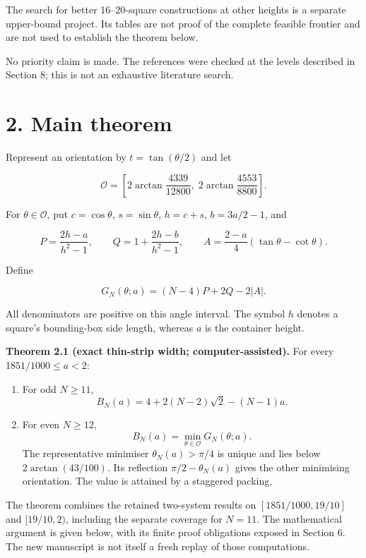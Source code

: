\documentclass[
  11pt,
  a4paper,
]{article}
\providecommand{\tightlist}{%
  \setlength{\itemsep}{0pt}\setlength{\parskip}{0pt}}
\begin{document}
The search for better 16--20-square constructions at other heights is a
separate upper-bound project. Its tables are not proof of the complete
feasible frontier and are not used to establish the theorem below.

No priority claim is made. The references were checked at the levels
described in Section 8; this is not an exhaustive literature search.

\section{2. Main theorem}\label{main-theorem}

Represent an orientation by \(t=\tan(\theta/2)\) and let

\[
\mathcal O=\left[2\arctan\frac{4339}{12800},\;2\arctan\frac{4553}{8800}\right].
\]

For \(\theta\in\mathcal O\), put \(c=\cos\theta\), \(s=\sin\theta\),
\(h=c+s\), \(b=3a/2-1\), and

\[
P=\frac{2h-a}{h^2-1},\qquad
Q=1+\frac{2h-b}{h^2-1},\qquad
A=\frac{2-a}{4}(\tan\theta-\cot\theta).
\]

Define

\[
G_N(\theta;a)=(N-4)P+2Q-2|A|.
\]

All denominators are positive on this angle interval. The symbol \(h\)
denotes a square's bounding-box side length, whereas \(a\) is the
container height.

\textbf{Theorem 2.1 (exact thin-strip width; computer-assisted).} For
every \(1851/1000\le a<2\):

\begin{enumerate}
\def\labelenumi{\arabic{enumi}.}
\tightlist
\item
  For odd \(N\ge11\), \[
  B_N(a)=4+2(N-2)\sqrt2-(N-1)a.
  \]
\item
  For even \(N\ge12\), \[
  B_N(a)=\min_{\theta\in\mathcal O}G_N(\theta;a).
  \] The representative minimiser \(\theta_N(a)>\pi/4\) is unique and
  lies below \(2\arctan(43/100)\). Its reflection \(\pi/2-\theta_N(a)\)
  gives the other minimising orientation. The value is attained by a
  staggered packing.
\end{enumerate}

The theorem combines the retained two-system results on
\([1851/1000,19/10]\) and \([19/10,2)\), including the separate coverage
for \(N=11\). The mathematical argument is given below, with its finite
proof obligations exposed in Section 6. The new manuscript is not itself
a fresh replay of those computations.
\end{document}
